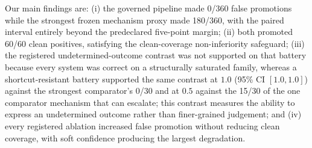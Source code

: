 Our main findings are: (i) the governed pipeline made 0/360 false promotions while the strongest frozen mechanism proxy made 180/360, with the paired interval entirely beyond the predeclared five-point margin; (ii) both promoted 60/60 clean positives, satisfying the clean-coverage non-inferiority safeguard; (iii) the registered undetermined-outcome contrast was not supported on that battery because every system was correct on a structurally saturated family, whereas a shortcut-resistant battery supported the same contrast at $1.0$ (95\% CI $[1.0,1.0]$) against the strongest comparator's 0/30 and at $0.5$ against the 15/30 of the one comparator mechanism that can escalate; this contrast measures the ability to express an undetermined outcome rather than finer-grained judgement; and (iv) every registered ablation increased false promotion without reducing clean coverage, with soft confidence producing the largest degradation.
